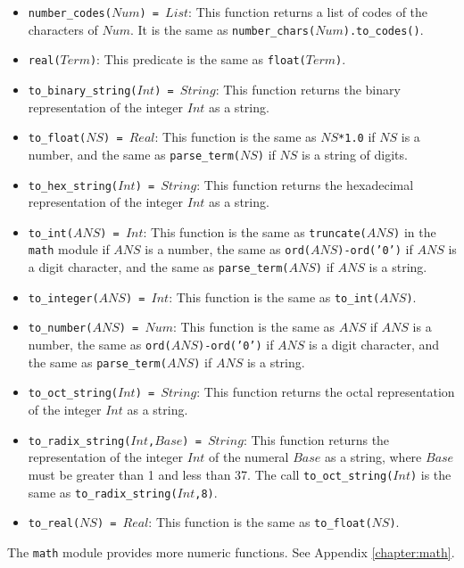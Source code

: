 \begin{itemize}
\item \texttt{number\_codes($Num$) = $List$}: This function returns a list of codes of the characters of $Num$. It is the same as \texttt{number\_chars($Num$).to\_codes()}.
\item \texttt{real($Term$)}: This predicate is the same as \texttt{float($Term$)}.
\item \texttt{to\_binary\_string($Int$) = $String$}: This function returns the binary representation of the integer $Int$ as a string.
\item \texttt{to\_float($NS$) = $Real$}: This function is the same as \texttt{$NS$*1.0} if $NS$ is a number, and the same as \texttt{parse\_term($NS$)} if $NS$ is a string of digits.
\item \texttt{to\_hex\_string($Int$) = $String$}: This function returns the hexadecimal representation of the integer $Int$ as a string.
\item \texttt{to\_int($ANS$) = $Int$}: This function is the same as \texttt{truncate($ANS$)} in the \texttt{math} module if $ANS$ is a number, the same as \texttt{ord($ANS$)-ord('0')} if $ANS$ is a digit character, and the same as \texttt{parse\_term($ANS$)} if $ANS$ is a string.
\item \texttt{to\_integer($ANS$) = $Int$}: This function is the same as \texttt{to\_int($ANS$)}.
\item \texttt{to\_number($ANS$) = $Num$}: This function is the same as $ANS$ if $ANS$ is a number, the same as \texttt{ord($ANS$)-ord('0')} if $ANS$ is a digit character, and the same as \texttt{parse\_term($ANS$)} if $ANS$ is a string.
\item \texttt{to\_oct\_string($Int$) = $String$}:  This function returns the octal representation of the integer $Int$ as a string.
\item \texttt{to\_radix\_string($Int$,$Base$) = $String$}:  This function returns the representation of the integer $Int$ of the numeral $Base$ as a string, where $Base$ must be greater than 1 and less than 37. The call \texttt{to\_oct\_string($Int$)} is the same as \texttt{to\_radix\_string($Int$,8)}.
\item \texttt{to\_real($NS$) = $Real$}: This function is the same as \texttt{to\_float($NS$)}.
\end{itemize}
The \texttt{math} module provides more numeric functions.  See Appendix \ref{chapter:math}.

